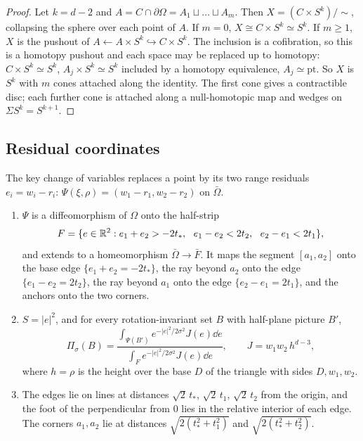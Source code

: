 \begin{proof}
Let $k = d - 2$ and $A = C \cap \partial\Omega = A_1 \sqcup \dots \sqcup A_m$. Then $X = (C \times S^k)/\!\sim$, collapsing
the sphere over each point of $A$. If $m = 0$, $X \cong C \times S^k \simeq S^k$. If $m \ge 1$, $X$ is the pushout of
$A \leftarrow A \times S^k \hookrightarrow C \times S^k$. The inclusion is a cofibration, so this is a homotopy pushout and
each space may be replaced up to homotopy: $C \times S^k \simeq S^k$, $A_j \times S^k \simeq S^k$ included by a homotopy
equivalence, $A_j \simeq \mathrm{pt}$. So $X$ is $S^k$ with $m$ cones attached along the identity. The first cone gives a
contractible disc; each further cone is attached along a null-homotopic map and wedges on $\Sigma S^k = S^{k+1}$.
\end{proof}

\subsection{Residual coordinates}

The key change of variables replaces a point by its two range residuals $e_i = w_i - r_i$:
$\Psi(\xi, \rho) = (w_1 - r_1, w_2 - r_2)$ on $\bar\Omega$.

\begin{lemma}\label{lem:residual}
\begin{enumerate}[label=(\roman*)]
\item $\Psi$ is a diffeomorphism of $\Omega$ onto the half-strip
\[ F = \{e \in \mathbb{R}^2 : e_1 + e_2 > -2t_*,\ \ e_1 - e_2 < 2t_2,\ \ e_2 - e_1 < 2t_1\}, \]
and extends to a homeomorphism $\bar\Omega \to \bar F$. It maps the segment $[a_1, a_2]$ onto the base edge
$\{e_1 + e_2 = -2t_*\}$, the ray beyond $a_2$ onto the edge $\{e_1 - e_2 = 2t_2\}$, the ray beyond $a_1$ onto the edge
$\{e_2 - e_1 = 2t_1\}$, and the anchors onto the two corners.
\item $S = |e|^2$, and for every rotation-invariant set $B$ with half-plane picture $B'$,
\[ \Pi_\sigma(B) = \frac{\int_{\Psi(B')} e^{-|e|^2/2\sigma^2} J(e)\dd e}{\int_F e^{-|e|^2/2\sigma^2} J(e)\dd e}, \qquad
   J = w_1 w_2\, h^{d-3}, \]
where $h = \rho$ is the height over the base $D$ of the triangle with sides $D, w_1, w_2$.
\item The edges lie on lines at distances $\sqrt2\,t_*$, $\sqrt2\,t_1$, $\sqrt2\,t_2$ from the origin, and the foot of
the perpendicular from $0$ lies in the relative interior of each edge. The corners $a_1, a_2$ lie at distances
$\sqrt{2(t_*^2 + t_1^2)}$ and $\sqrt{2(t_*^2 + t_2^2)}$.
\end{enumerate}
\end{lemma}

